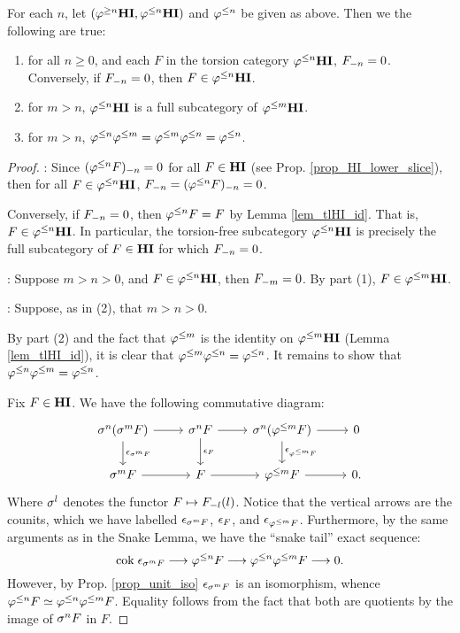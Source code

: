 \begin{prop}\label{prop_TFHI_properties}
For each $n$, let $(\THI{n}, \TFHI{n})$ and $\tlHI{n}$ be given
as above. Then we the following are true:

\begin{enumerate}
\item for all $n \geq 0$, and each $F$ in the torsion category 
$\TFHI{n}$, $\RHI[n] F = 0$. Conversely, if $\RHI[n] F = 0$, then
$F \in \TFHI{n}$.
\tinyskip

\item for $m > n$, $\TFHI{n}$ is a full subcategory of $\TFHI{m}$.
\tinyskip

\item for $m > n$, $\tlHI{n}\tlHI{m} = \tlHI{m}\tlHI{n} = \tlHI{n}$.
\tinyskip
\end{enumerate}
\end{prop}
\begin{proof}
 : Since $\RHI[n]{(\tlHI{n} F)} = 0$ for all $F \in 
\HI$ (see Prop. \ref{prop_HI_lower_slice}), then for all $F \in 
\TFHI{n}$, $\RHI[n]{F} = \RHI[n]{(\tlHI{n} F)} = 0$.

Conversely, if $\RHI[n]{F} = 0$, then $\tlHI{n} F = F$ by Lemma
\ref{lem_tlHI_id}. That is, $F \in \TFHI{n}$. In particular, the
torsion-free subcategory $\TFHI{n}$ is precisely the full 
subcategory of $F \in \HI$ for which $\RHI[n]{F} = 0$.

 : Suppose $m > n > 0$, and $F \in \TFHI{n}$, then
$\RHI[m]{F} = 0$. By part (1), $F \in \TFHI{m}$.

 : Suppose, as in (2), that $m > n > 0$.

By part (2) and the fact that $\tlHI{m}$ is the identity on 
$\TFHI{m}$ (Lemma \ref{lem_tlHI_id}), it is clear that 
$\tlHI{m}\tlHI{n} = \tlHI{n}$. It remains to show that 
$\tlHI{n}\tlHI{m} = \tlHI{n}$.

Fix $F \in \HI$. We have the following commutative diagram:
\[
\begin{tikzcd}
\sgHI{n}(\sgHI{m} F) \arrow{r}\arrow{d}{\cuHI_{\sgHI{m} F}} &
\sgHI{n} F \arrow{r}\arrow{d}{\cuHI_F} &
\sgHI{n}(\tlHI{m} F) \arrow{r}\arrow{d}{\cuHI_{\tlHI{m}F}} &
0 \\
\sgHI{m} F \arrow{r} &
F \arrow{r} &
\tlHI{m} F \arrow{r}&
0.
\end{tikzcd}
\]
Where $\sgHI{l}$ denotes the functor $F \mapsto 
\LHI[l]{\RHI[l]{F}}$. Notice that the vertical arrows are the 
counits, which we have labelled $\cuHI_{\sgHI{m}F}$, $\cuHI_F$, 
and $\cuHI_{\tlHI{m}F}$. Furthermore, by the same arguments as in 
the Snake Lemma, we have the ``snake tail'' exact sequence:
\[
\cok \cuHI_{\sgHI{m}F} \to \tlHI{n}F \to \tlHI{n}\tlHI{m}F \to 0.
\]
However, by Prop. \ref{prop_unit_iso} $\cuHI_{\sgHI{m} F}$ is an 
isomorphism, whence $\tlHI{n}F \simeq \tlHI{n}\tlHI{m} F$. 
Equality follows from the fact that both are quotients by the 
image of $\sgHI{n} F$ in $F$.
\end{proof}

